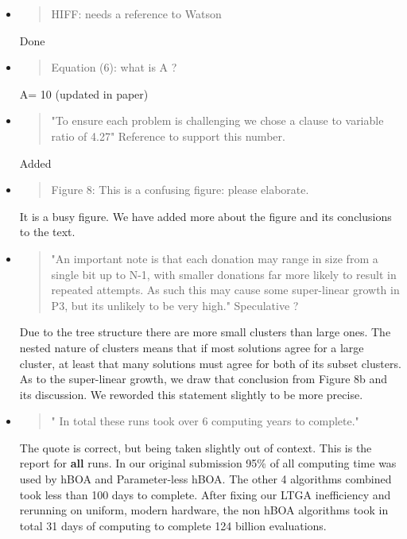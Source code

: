 \documentclass[]{article}
\begin{document}
\begin{itemize}
\item
\begin{quote}
HIFF: needs a reference to Watson
\end{quote}

Done

\item
\begin{quote}
Equation (6): what is A ?
\end{quote}

A= 10 (updated in paper)

\item
\begin{quote}
"To ensure each problem is challenging we chose a clause to variable ratio of 4.27"
Reference to support this number.
\end{quote}

Added 

\item
\begin{quote}
Figure 8: This is a confusing figure: please elaborate.
\end{quote}

It is a busy figure. We have added more about the figure and its conclusions to the text.

\item
\begin{quote}
 "An important note is that each donation may range in size from a single bit up to N-1, with smaller donations far more likely to result in repeated attempts. As such this may cause some super-linear growth in P3, but its unlikely to be very high."
Speculative ?
\end{quote}

Due to the tree structure there are more small clusters than large ones. The nested nature of clusters means that if most solutions agree for a large cluster, at least that many solutions must agree for both of its subset clusters. As to the super-linear growth, we draw that conclusion from Figure 8b and its discussion. We reworded this statement slightly to be more precise.

\item
\begin{quote}
" In total these runs took over 6 computing years to complete."
\end{quote}

The quote is correct, but being taken slightly out of context. This is the report for \textbf{all} runs. In our original submission 95\% of all computing time was used by hBOA and Parameter-less hBOA. The other 4 algorithms combined took less than 100 days to complete. After fixing our LTGA inefficiency and rerunning on uniform, modern hardware, the non hBOA algorithms took in total 31 days of computing to complete 124 billion evaluations.


\end{itemize}
\end{document}
